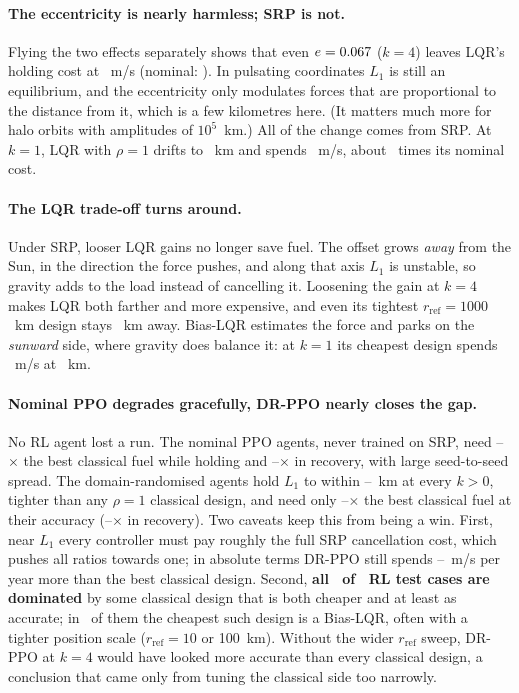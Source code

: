\documentclass[11pt,a4paper]{article}
\begin{document}
\paragraph{The eccentricity is nearly harmless; SRP is not.}
Flying the two effects separately shows that even
$e = 0.067$ ($k = 4$) leaves LQR's holding cost at \mmEccDvKfour~m/s
(nominal: \mmNomDvLqr). In pulsating coordinates $L_1$ is still an
equilibrium, and the eccentricity only modulates forces that are proportional
to the distance from it, which is a few kilometres here. (It matters much more
for halo orbits with amplitudes of $10^5$~km.) All of the change comes from
SRP. At $k = 1$, LQR with $\rho = 1$ drifts to \mmLqrHoldDistKone~km and spends
\mmLqrHoldDvKone~m/s, about \mmDvGrowthKone\ times its nominal cost.

\paragraph{The LQR trade-off turns around.}
Under SRP, looser LQR gains no longer save fuel. The offset grows
\emph{away} from the Sun, in the direction the force pushes, and along that
axis $L_1$ is unstable, so gravity adds to the load instead of cancelling it.
Loosening the gain at $k = 4$ makes LQR both farther and more expensive, and
even its tightest $r_\text{ref} = 1000$~km design stays \mmLqrTightKfour~km
away. Bias-LQR estimates the force and parks on the \emph{sunward} side, where
gravity does balance it: at $k = 1$ its cheapest design spends
\mmCheapDvKone~m/s at \mmCheapDistKone~km.

\paragraph{Nominal PPO degrades gracefully, DR-PPO nearly closes the gap.}
No RL agent lost a run. The nominal PPO agents, never trained on SRP, need
\mmPpoHoldMin--\mmPpoHoldMax$\times$ the best classical fuel while holding and
\mmPpoAcqMin--\mmPpoAcqMax$\times$ in recovery, with large seed-to-seed spread.
The domain-randomised agents hold $L_1$ to within \mmDrDistMin--\mmDrDistMax~km
at every $k > 0$, tighter than any $\rho = 1$ classical design, and need only
\mmDrHoldMin--\mmDrHoldMax$\times$ the best classical fuel at their accuracy
(\mmDrAcqMin--\mmDrAcqMax$\times$ in recovery). Two caveats keep this from
being a win. First, near $L_1$ every controller must pay roughly the full SRP
cancellation cost, which pushes all ratios towards one; in absolute terms
DR-PPO still spends \mmDrExcessMin--\mmDrExcessMax~m/s per year more than the
best classical design. Second, \textbf{all \mmRlDominated\ of \mmRlRuns\ RL test
cases are dominated} by some classical design that is both cheaper and at least
as accurate; in \mmBiasBest\ of them the cheapest such design is a Bias-LQR,
often with a tighter position scale ($r_\text{ref} = 10$ or 100~km). Without
the wider $r_\text{ref}$ sweep, DR-PPO at $k = 4$ would have looked more
accurate than every classical design, a conclusion that came only from tuning
the classical side too narrowly.
\end{document}
